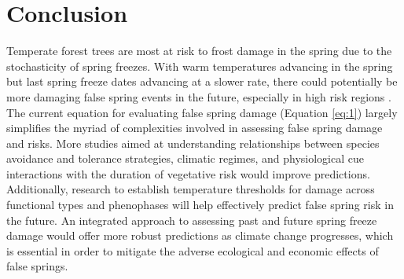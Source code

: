 \documentclass{article}\usepackage[]{graphicx}\usepackage[]{color}
\begin{document}
\section{Conclusion}
Temperate forest trees are most at risk to frost damage in the spring due to the stochasticity of spring freezes. With warm temperatures advancing in the spring but last spring freeze dates advancing at a slower rate, there could potentially be more damaging false spring events in the future, especially in high risk regions \citep{Gu2008, Inouye2008}. The current equation for evaluating false spring damage (Equation \ref{eq:1}) largely simplifies the myriad of complexities involved in assessing false spring damage and risks. More studies aimed at understanding relationships between species avoidance and tolerance strategies, climatic regimes, and physiological cue interactions with the duration of vegetative risk would improve predictions. Additionally, research to establish temperature thresholds for damage across functional types and phenophases will help effectively predict false spring risk in the future. An integrated approach to assessing past and future spring freeze damage would offer more robust predictions as climate change progresses, which is essential in order to mitigate the adverse ecological and economic effects of false springs.

\nocite{Soudani2012}
\nocite{White2009}
\nocite{Schaber2005}
\nocite{Schwartz1993}
\nocite{Barker2005}
\nocite{Sanchez2013}
\nocite{Longstroth2012}
\nocite{Barlow2015}
\nocite{Longstroth2013}
\nocite{Charrier2011}

\end{document}
